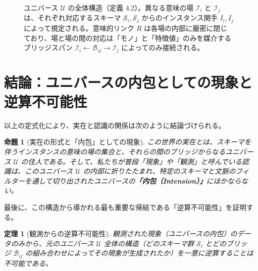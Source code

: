 \documentclass[11pt,a4paper,luatex]{jlreq}
\theoremstyle{definition}
\theoremstyle{plain}
\newtheorem{proposition}[definition]{命題}
\newtheorem{theorem}[definition]{定理}
\begin{document}
\begin{figure}[htbp]
\centering
{}
\caption{ユニバース $\mathcal{U}$ の全体構造（定義 4.2）。異なる意味の場 $\mathcal{I}_i$ と $\mathcal{I}_j$ は、それぞれ対応するスキーマ $\mathcal{S}_i, \mathcal{S}_j$ からのインスタンス関手 $I_i, I_j$ によって規定される。意味的リンク $R$ は各場の内部に厳密に閉じており、場と場の間の対応は「モノ」と「特徴値」のみを媒介するブリッジスパン $\mathcal{I}_i \leftarrow \mathcal{B}_{ij} \rightarrow \mathcal{I}_j$ によってのみ接続される。}
\label{fig:universe_bridge}
\end{figure}

\section{結論：ユニバースの内包としての現象と逆算不可能性}

以上の定式化により、実在と認識の関係は次のように結論づけられる。

\begin{proposition}[実在の形式と「内包」としての現象]
この世界の実在とは、スキーマを伴うインスタンスの意味の場の集合と、それらの間のブリッジからなるユニバース $\mathcal{U}$ の住人である。そして、私たちが普段「現象」や「観測」と呼んでいる認識は、このユニバース $\mathcal{U}$ の内部に折りたたまれ、特定のスキーマと文脈のフィルターを通して切り出されたユニバースの\textbf{「内包（Intension）」}にほかならない。
\end{proposition}

最後に、この構造から導かれる最も重要な帰結である「逆算不可能性」を証明する。

\begin{theorem}[観測からの逆算不可能性]
観測された現象（ユニバースの内包）のデータのみから、元のユニバース $\mathcal{U}$ 全体の構造（どのスキーマ群 $\mathcal{S}_{i}$ とどのブリッジ $\mathcal{B}_{ij}$ の組み合わせによってその現象が生成されたか）を一意に逆算することは不可能である。
\end{theorem}
\end{document}
